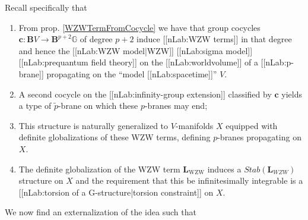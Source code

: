 \documentclass[12pt,titlepage]{article}
\theoremstyle{plain}
\theoremstyle{definition}
\theoremstyle{remark}
\begin{document}
Recall specifically that

\begin{enumerate}%
\item From prop. \ref{WZWTermFromCocycle} we have that group cocycles $\mathbf{c}\colon \mathbf{B}V \longrightarrow \mathbf{B}^{p+2}\mathbb{G}$ of degree $p+2$ induce [[nLab:WZW terms]] in that degree and hence the [[nLab:WZW model|WZW]] [[nLab:sigma model]] [[nLab:prequantum field theory]] on the [[nLab:worldvolume]] of a [[nLab:p-brane]] propagating on the ``model [[nLab:spacetime]]'' $V$.


\item A second cocycle on the [[nLab:infinity-group extension]] classified by $\mathbf{c}$ yields a type of $\tilde p$-brane on which these $p$-branes may end;


\item This structure is naturally generalized to $V$-manifolds $X$ equipped with definite globalizations of these WZW terms, defining $p$-branes propagating on $X$.


\item The definite globalization of the WZW term $\mathbf{L}_{\mathrm{WZW}}$ induces a $Stab(\mathbf{L}_{WZW})$ structure on $X$ and the requirement that this be infinitesimally integrable is a [[nLab:torsion of a G-structure|torsion constraint]] on $X$.



\end{enumerate}
We now find an externalization of the idea such that
\end{document}

